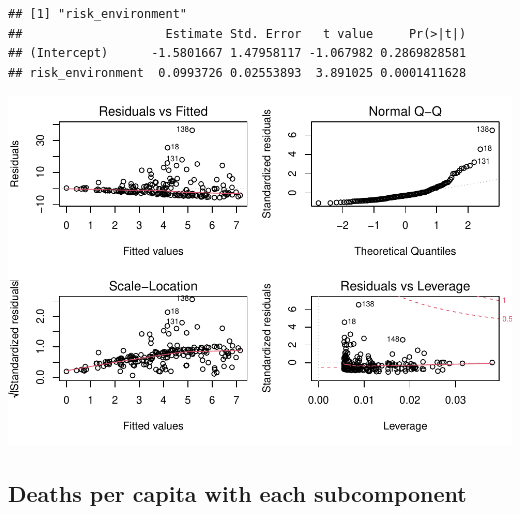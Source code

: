 \documentclass[
]{article}
\begin{document}
\begin{verbatim}
## [1] "risk_environment"
##                    Estimate Std. Error   t value     Pr(>|t|)
## (Intercept)      -1.5801667 1.47958117 -1.067982 0.2869828581
## risk_environment  0.0993726 0.02553893  3.891025 0.0001411628
\end{verbatim}

\includegraphics{Basic-Regression_files/figure-latex/unnamed-chunk-4-6.pdf}

\hypertarget{deaths-per-capita-with-each-subcomponent}{%
\subsection{Deaths per capita with each
subcomponent}\label{deaths-per-capita-with-each-subcomponent}}
\end{document}
